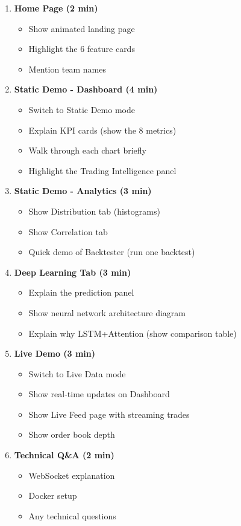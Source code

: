 \documentclass[12pt,a4paper]{article}
\begin{document}
\begin{enumerate}
    \item \textbf{Home Page (2 min)}
    \begin{itemize}
        \item Show animated landing page
        \item Highlight the 6 feature cards
        \item Mention team names
    \end{itemize}
    
    \item \textbf{Static Demo - Dashboard (4 min)}
    \begin{itemize}
        \item Switch to Static Demo mode
        \item Explain KPI cards (show the 8 metrics)
        \item Walk through each chart briefly
        \item Highlight the Trading Intelligence panel
    \end{itemize}
    
    \item \textbf{Static Demo - Analytics (3 min)}
    \begin{itemize}
        \item Show Distribution tab (histograms)
        \item Show Correlation tab
        \item Quick demo of Backtester (run one backtest)
    \end{itemize}
    
    \item \textbf{Deep Learning Tab (3 min)}
    \begin{itemize}
        \item Explain the prediction panel
        \item Show neural network architecture diagram
        \item Explain why LSTM+Attention (show comparison table)
    \end{itemize}
    
    \item \textbf{Live Demo (3 min)}
    \begin{itemize}
        \item Switch to Live Data mode
        \item Show real-time updates on Dashboard
        \item Show Live Feed page with streaming trades
        \item Show order book depth
    \end{itemize}
    
    \item \textbf{Technical Q\&A (2 min)}
    \begin{itemize}
        \item WebSocket explanation
        \item Docker setup
        \item Any technical questions
    \end{itemize}
\end{enumerate}
\end{document}
